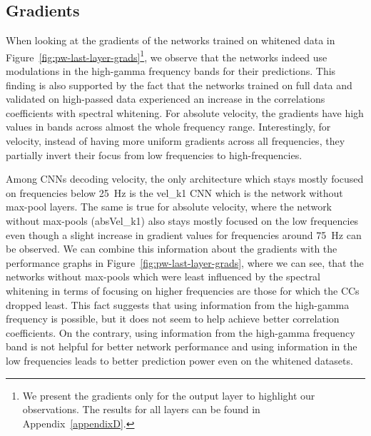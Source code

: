 \subsection{Gradients}\label{subsec:pw-gradients2}
When looking at the gradients of the networks trained on whitened data in Figure~\ref{fig:pw-last-layer-grads}\footnote{We present the gradients only for the output layer to highlight our observations. 
The results for all layers can be found in Appendix~\ref{appendixD}.}, we observe that the networks indeed use modulations in the high-gamma frequency bands for their predictions. 
This finding is also supported by the fact that the networks trained on full data and validated on high-passed data experienced an increase in the correlations coefficients with spectral whitening.
For absolute velocity, the gradients have high values in bands across almost the whole frequency range. Interestingly, for velocity, instead of having more uniform gradients across all frequencies, they partially invert their focus from low frequencies to high-frequencies.

Among CNNs decoding velocity, the only architecture which stays mostly focused on frequencies below 25~Hz is the vel\_k1 CNN which is the network without max-pool layers.
The same is true for absolute velocity, where the network without max-pools (absVel\_k1) also stays mostly focused on the low frequencies even though a slight increase in gradient values for frequencies around 75~Hz can be observed. 
We can combine this information about the gradients with the performance graphs in Figure~\ref{fig:pw-last-layer-grads}, where we can see, that the networks without max-pools which were least influenced by the spectral whitening in terms of focusing on higher frequencies are those for which the CCs dropped least.
This fact suggests that using information from the high-gamma frequency is possible, but it does not seem to help achieve better correlation coefficients. 
On the contrary, using information from the high-gamma frequency band is not helpful for better network performance and using information in the low frequencies leads to better prediction power even on the whitened datasets.

